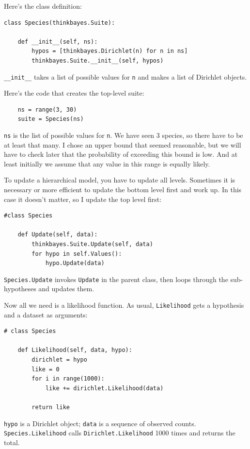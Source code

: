 \documentclass[12pt]{book}
\begin{document}
Here's the class definition:

\begin{verbatim}
class Species(thinkbayes.Suite):

    def __init__(self, ns):
        hypos = [thinkbayes.Dirichlet(n) for n in ns]
        thinkbayes.Suite.__init__(self, hypos)
\end{verbatim}

\verb"__init__" takes a list of possible values for {\tt n} and
makes a list of Dirichlet objects.

Here's the code that creates the top-level suite:

\begin{verbatim}
    ns = range(3, 30)
    suite = Species(ns)
\end{verbatim}

{\tt ns} is the list of possible values for {\tt n}.  We have seen 3
species, so there have to be at least that many.  I chose an upper
bound that seemed reasonable, but we will have to check later that the
probability of exceeding this bound is low.  And at least initially
we assume that any value in this range is equally likely.

To update a hierarchical model, you have to update all levels.
Sometimes it is necessary or more efficient to update the bottom
level first and work up.  In this case it doesn't matter, so
I update the top level first:

\begin{verbatim}
#class Species

    def Update(self, data):
        thinkbayes.Suite.Update(self, data)
        for hypo in self.Values():
            hypo.Update(data)
\end{verbatim}

{\tt Species.Update} invokes {\tt Update} in the parent class,
then loops through the sub-hypotheses and updates them.

Now all we need is a likelihood function.  As usual,
{\tt Likelihood} gets a hypothesis and a dataset as arguments:

\begin{verbatim}
# class Species

    def Likelihood(self, data, hypo):
        dirichlet = hypo
        like = 0
        for i in range(1000):
            like += dirichlet.Likelihood(data)

        return like
\end{verbatim}

{\tt hypo} is a Dirichlet object; {\tt data} is a sequence of
observed counts.  {\tt Species.Likelihood} calls
{\tt Dirichlet.Likelihood} 1000 times and returns the total.
\end{document}
